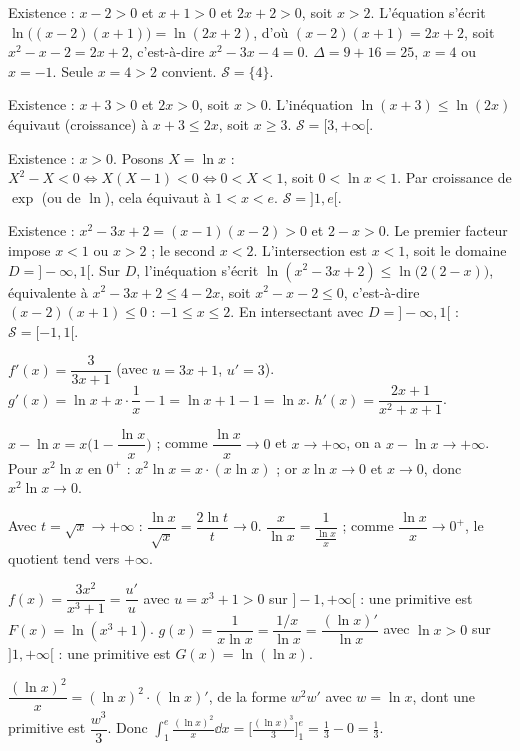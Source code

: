 Existence : $x-2>0$ et $x+1>0$ et $2x+2>0$, soit $x>2$. L'équation s'écrit
$\ln\big((x-2)(x+1)\big)=\ln(2x+2)$, d'où $(x-2)(x+1)=2x+2$, soit $x^{2}-x-2=2x+2$,
c'est-à-dire $x^{2}-3x-4=0$. $\Delta=9+16=25$, $x=4$ ou $x=-1$. Seule $x=4>2$ convient.
$\mathcal S=\{4\}$.

Existence : $x+3>0$ et $2x>0$, soit $x>0$. L'inéquation $\ln(x+3)\le\ln(2x)$ équivaut
(croissance) à $x+3\le2x$, soit $x\ge3$. $\mathcal S=[3,+\infty[$.

Existence : $x>0$. Posons $X=\ln x$ : $X^{2}-X<0\iff X(X-1)<0\iff 0<X<1$, soit
$0<\ln x<1$. Par croissance de $\exp$ (ou de $\ln$), cela équivaut à $1<x<e$.
$\mathcal S=]1,e[$.

Existence : $x^{2}-3x+2=(x-1)(x-2)>0$ et $2-x>0$. Le premier facteur impose
$x<1$ ou $x>2$ ; le second $x<2$. L'intersection est $x<1$, soit le domaine $D=]-\infty,1[$.
Sur $D$, l'inéquation s'écrit $\ln(x^{2}-3x+2)\le\ln\big(2(2-x)\big)$, équivalente à
$x^{2}-3x+2\le4-2x$, soit $x^{2}-x-2\le0$, c'est-à-dire $(x-2)(x+1)\le0$ : $-1\le x\le2$.
En intersectant avec $D=]-\infty,1[$ : $\mathcal S=[-1,1[$.

$f'(x)=\dfrac{3}{3x+1}$ (avec $u=3x+1$, $u'=3$).\;
$g'(x)=\ln x+x\cdot\dfrac1x-1=\ln x+1-1=\ln x$.\;
$h'(x)=\dfrac{2x+1}{x^{2}+x+1}$.

$x-\ln x=x\Big(1-\dfrac{\ln x}{x}\Big)$ ; comme $\dfrac{\ln x}{x}\to0$ et $x\to+\infty$, on a
$x-\ln x\to+\infty$.\;
Pour $x^{2}\ln x$ en $0^{+}$ : $x^{2}\ln x=x\cdot(x\ln x)$ ; or $x\ln x\to0$ et $x\to0$, donc
$x^{2}\ln x\to0$.

Avec $t=\sqrt x\to+\infty$ : $\dfrac{\ln x}{\sqrt x}=\dfrac{2\ln t}{t}\to0$.\;
$\dfrac{x}{\ln x}=\dfrac{1}{\frac{\ln x}{x}}$ ; comme $\dfrac{\ln x}{x}\to0^{+}$, le quotient
tend vers $+\infty$.

$f(x)=\dfrac{3x^{2}}{x^{3}+1}=\dfrac{u'}{u}$ avec $u=x^{3}+1>0$ sur $]-1,+\infty[$ : une
primitive est $F(x)=\ln(x^{3}+1)$.\;
$g(x)=\dfrac1{x\ln x}=\dfrac{1/x}{\ln x}=\dfrac{(\ln x)'}{\ln x}$ avec $\ln x>0$ sur
$]1,+\infty[$ : une primitive est $G(x)=\ln(\ln x)$.

$\dfrac{(\ln x)^{2}}{x}=(\ln x)^{2}\cdot(\ln x)'$, de la forme $w^{2}w'$ avec $w=\ln x$, dont
une primitive est $\dfrac{w^{3}}{3}$. Donc
$\displaystyle\int_{1}^{e}\frac{(\ln x)^{2}}{x}\dd x=\Big[\frac{(\ln x)^{3}}{3}\Big]_{1}^{e}
=\frac13-0=\frac13$.

